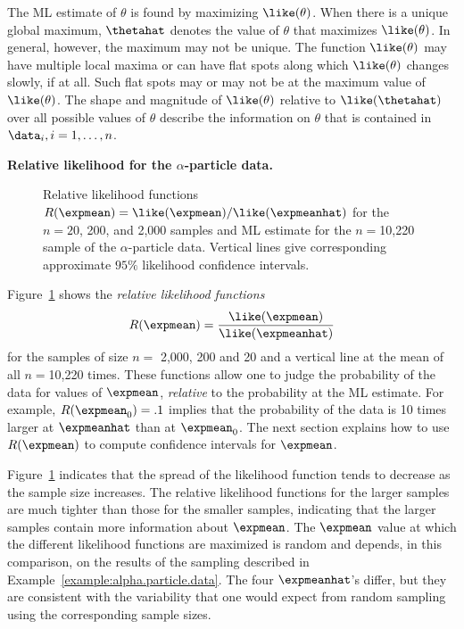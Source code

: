 The ML estimate of $\theta$ is found by
maximizing $\like(\theta)$.  When there is a unique global maximum,
$\thetahat$ denotes the value of $\theta$ that maximizes
$\like(\theta)$.  In general, however, the maximum may not be
unique. The function $\like(\theta)$ may have multiple local maxima or can
have flat spots along which $\like(\theta)$ changes slowly, if at all.
Such flat spots may or may not be at the maximum value of
$\like(\theta)$. The shape and magnitude of $\like(\theta)$ relative
to $\like(\thetahat)$ over all possible values of $\theta$ describe
the information on $\theta$ that is contained in $\data_{i}, i=1,
\ldots , n$.

\begin{example}
{\bf Relative likelihood for the $\alpha$-particle data.}
\begin{figure}
\caption{Relative likelihood functions
$R(\expmean)=\like(\expmean)/\like(\expmeanhat)$ for the $n= 20$, 200, 
and 2,000 samples and ML estimate for the $n=$10,220 sample of the
$\alpha$-particle data. Vertical lines give corresponding
approximate $95\%$ likelihood confidence intervals.}
\label{figure:alpha.exp.thetapro.ps}
\end{figure}
Figure~\ref{figure:alpha.exp.thetapro.ps} shows the {\em relative
likelihood functions}
\begin{displaymath}
R(\expmean)=\frac{\like(\expmean)}{\like(\expmeanhat)}
\end{displaymath}
for the samples of size $n=$ 2,000, 200 and 20 and a vertical line at
the mean of all $n=$10,220 times.  These functions allow one to judge the
probability of the data for values of $\expmean$, {\em relative} to
the probability at the ML estimate.  For example, 
$R(\expmean_{0})=.1$
implies that the probability 
of the data is 10 times larger at $\expmeanhat$ than
at $\expmean_{0}$. The next section explains 
how to use $R(\expmean)$
to compute confidence intervals for $\expmean$.



Figure~\ref{figure:alpha.exp.thetapro.ps} indicates that the spread of
the likelihood function tends to decrease as the sample size increases.
The relative
likelihood functions for the larger samples are much tighter
than those for the smaller samples, indicating that the larger samples
contain more information about $\expmean$.  The $\expmean$ value at
which the different likelihood functions are maximized is random and
depends, in this comparison, on the results of the sampling described
in Example~\ref{example:alpha.particle.data}. The four $\expmeanhat$'s
differ, but they are consistent with the variability that one would expect
from random sampling using the corresponding sample sizes.  
\end{example}

